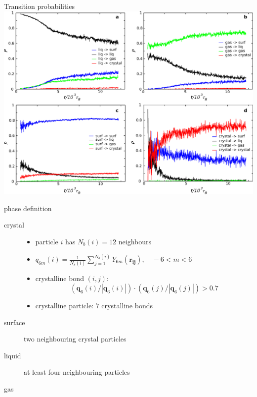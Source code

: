 \documentclass[xcolor=table]{beamer}
\begin{document}
\begin{frame}{Transition probabilities}
	\vspace{\baselineskip}
	\includegraphics[width=\textwidth]{nature/sfig1.pdf}
\end{frame}

\begin{frame}{phase definition}
	\begin{description}
	\item[crystal]
		\begin{itemize} 
		\item particle $i$ has $N_b(i)=12$ neighbours
		\item $\displaystyle q_{6 m}(i)=\frac{1}{N_b(i)}\sum_{j=1}^{N_b(i)}
	Y_{6 m}(\mathbf{r_{ij}}),\quad -6 <m<6$
		\item crystalline bond $(i,j)$: \[(\mathbf{q}_{6}(i)/|\mathbf{q}_{6}(i)|)\cdot(\mathbf{q}_{6}(j)/|\mathbf{q}_{6}(j)|)>0.7\]
		\item crystalline particle: $7$ crystalline bonds
		\end{itemize}
	\item[surface] two neighbouring crystal particles
	\item[liquid] at least four neighbouring particles
	\item[gas]
	\end{description}
\end{frame}
\end{document}
